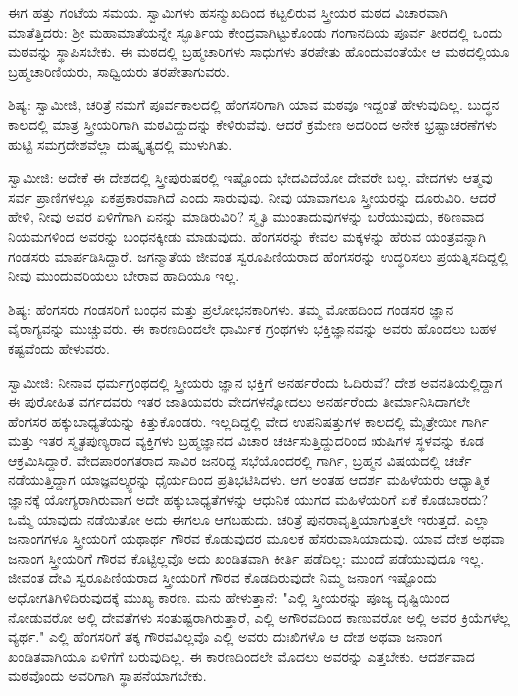 ಈಗ ಹತ್ತು ಗಂಟೆಯ ಸಮಯ. ಸ್ವಾಮಿಗಳು ಹಸನ್ಮುಖದಿಂದ ಕಟ್ಟಲಿರುವ ಸ್ತ್ರೀಯರ ಮಠದ ವಿಚಾರವಾಗಿ ಮಾತೆತ್ತಿದರು: ಶ‍್ರೀ ಮಹಾಮಾತೆಯನ್ನೇ ಸ್ಫೂರ್ತಿಯ ಕೇಂದ್ರವಾಗಿಟ್ಟುಕೊಂಡು ಗಂಗಾನದಿಯ ಪೂರ್ವ ತೀರದಲ್ಲಿ ಒಂದು ಮಠವನ್ನು ಸ್ಥಾಪಿಸಬೇಕು. ಈ ಮಠದಲ್ಲಿ ಬ್ರಹ್ಮಚಾರಿಗಳು ಸಾಧುಗಳು ತರಪೇತು ಹೊಂದುವಂತೆಯೇ ಆ ಮಠದಲ್ಲಿಯೂ ಬ್ರಹ್ಮಚಾರಿಣಿಯರು, ಸಾಧ್ವಿಯರು ತರಪೇತಾಗುವರು.

ಶಿಷ್ಯ: ಸ್ವಾಮೀಜಿ, ಚರಿತ್ರೆ ನಮಗೆ ಪೂರ್ವಕಾಲದಲ್ಲಿ ಹೆಂಗಸರಿಗಾಗಿ ಯಾವ ಮಠವೂ ಇದ್ದಂತೆ ಹೇಳುವುದಿಲ್ಲ. ಬುದ್ಧನ ಕಾಲದಲ್ಲಿ ಮಾತ್ರ ಸ್ತ್ರೀಯರಿಗಾಗಿ ಮಠವಿದ್ದುದನ್ನು ಕೇಳಿರುವೆವು. ಆದರೆ ಕ್ರಮೇಣ ಅದರಿಂದ ಅನೇಕ ಭ್ರಷ್ಟಾಚರಣೆಗಳು ಹುಟ್ಟಿ ಸಮಗ್ರದೇಶವೆಲ್ಲಾ ದುಷ್ಕೃತ್ಯದಲ್ಲಿ ಮುಳುಗಿತು.

ಸ್ವಾಮೀಜಿ: ಅದೇಕೆ ಈ ದೇಶದಲ್ಲಿ ಸ್ತ್ರೀಪುರುಷರಲ್ಲಿ ಇಷ್ಟೊಂದು ಭೇದವಿದೆಯೋ ದೇವರೇ ಬಲ್ಲ. ವೇದಗಳು ಆತ್ಮವು ಸರ್ವ ಪ್ರಾಣಿಗಳಲ್ಲೂ ಏಕಪ್ರಕಾರವಾಗಿದೆ ಎಂದು ಸಾರುವುವು. ನೀವು ಯಾವಾಗಲೂ ಸ್ತ್ರೀಯರನ್ನು ದೂರುವಿರಿ. ಆದರೆ ಹೇಳಿ, ನೀವು ಅವರ ಏಳಿಗೆಗಾಗಿ ಏನನ್ನು ಮಾಡಿರುವಿರಿ? ಸ್ಮೃತಿ ಮುಂತಾದುವುಗಳನ್ನು ಬರೆಯುವುದು, ಕಠಿಣವಾದ ನಿಯಮಗಳಿಂದ ಅವರನ್ನು ಬಂಧನಕ್ಕೀಡು ಮಾಡುವುದು. ಹೆಂಗಸರನ್ನು ಕೇವಲ ಮಕ್ಕಳನ್ನು ಹೆರುವ ಯಂತ್ರವನ್ನಾಗಿ ಗಂಡಸರು ಮಾರ್ಪಡಿಸಿದ್ದಾರೆ. ಜಗನ್ಮಾತೆಯ ಜೀವಂತ ಸ್ವರೂಪಿಣಿಯರಾದ ಹೆಂಗಸರನ್ನು ಉದ್ಧರಿಸಲು ಪ್ರಯತ್ನಿಸದಿದ್ದಲ್ಲಿ ನೀವು ಮುಂದುವರಿಯಲು ಬೇರಾವ ಹಾದಿಯೂ ಇಲ್ಲ.

ಶಿಷ್ಯ: ಹೆಂಗಸರು ಗಂಡಸರಿಗೆ ಬಂಧನ ಮತ್ತು ಪ್ರಲೋಭನಕಾರಿಗಳು. ತಮ್ಮ ಮೋಹದಿಂದ ಗಂಡಸರ ಜ್ಞಾನ ವೈರಾಗ್ಯವನ್ನು ಮುಚ್ಚುವರು. ಈ ಕಾರಣದಿಂದಲೇ ಧಾರ್ಮಿಕ ಗ್ರಂಥಗಳು ಭಕ್ತಿಜ್ಞಾನವನ್ನು ಅವರು ಹೊಂದಲು ಬಹಳ ಕಷ್ಟವೆಂದು ಹೇಳುವರು.

ಸ್ವಾಮೀಜಿ: ನೀನಾವ ಧರ್ಮಗ್ರಂಥದಲ್ಲಿ ಸ್ತ್ರೀಯರು ಜ್ಞಾನ ಭಕ್ತಿಗೆ ಅನರ್ಹರೆಂದು ಓದಿರುವೆ? ದೇಶ ಅವನತಿಯಲ್ಲಿದ್ದಾಗ ಈ ಪುರೋಹಿತ ವರ್ಗದವರು ಇತರ ಜಾತಿಯವರು ವೇದಗಳನ್ನೋದಲು ಅನರ್ಹರೆಂದು ತೀರ್ಮಾನಿಸಿದಾಗಲೇ ಹೆಂಗಸರ ಹಕ್ಕುಬಾಧ್ಯತೆಯನ್ನು ಕಿತ್ತುಕೊಂಡರು. ಇಲ್ಲದಿದ್ದಲ್ಲಿ ವೇದ ಉಪನಿಷತ್ತುಗಳ ಕಾಲದಲ್ಲಿ ಮೈತ್ರೇಯೀ ಗಾರ್ಗಿ ಮತ್ತು ಇತರ ಸ್ಮೃತಪುಣ್ಯರಾದ ವ್ಯಕ್ತಿಗಳು ಬ್ರಹ್ಮಜ್ಞಾನದ ವಿಚಾರ ಚರ್ಚಿಸುತ್ತಿದ್ದುದರಿಂದ ಋಷಿಗಳ ಸ್ಥಳವನ್ನು ಕೂಡ ಆಕ್ರಮಿಸಿದ್ದಾರೆ. ವೇದಪಾರಂಗತರಾದ ಸಾವಿರ ಜನರಿದ್ದ ಸಭೆಯೊಂದರಲ್ಲಿ ಗಾರ್ಗಿ, ಬ್ರಹ್ಮನ ವಿಷಯದಲ್ಲಿ ಚರ್ಚೆ ನಡೆಯುತ್ತಿದ್ದಾಗ ಯಾಜ್ಞವಲ್ಕ್ಯರನ್ನು ಧೈರ್ಯದಿಂದ ಪ್ರತಿಭಟಿಸಿದಳು. ಆಗ ಅಂತಹ ಆದರ್ಶ ಮಹಿಳೆಯರು ಆಧ್ಯಾತ್ಮಿಕ ಜ್ಞಾನಕ್ಕೆ ಯೋಗ್ಯರಾಗಿರುವಾಗ ಅದೇ ಹಕ್ಕುಬಾಧ್ಯತೆಗಳನ್ನು ಆಧುನಿಕ ಯುಗದ ಮಹಿಳೆಯರಿಗೆ ಏಕೆ ಕೊಡಬಾರದು? ಒಮ್ಮೆ ಯಾವುದು ನಡೆಯಿತೋ ಅದು ಈಗಲೂ ಆಗಬಹುದು. ಚರಿತ್ರೆ ಪುನರಾವೃತ್ತಿಯಾಗುತ್ತಲೇ ಇರುತ್ತದೆ. ಎಲ್ಲಾ ಜನಾಂಗಗಳೂ ಸ್ತ್ರೀಯರಿಗೆ ಯಥಾರ್ಥ ಗೌರವ ಕೊಡುವುದರ ಮೂಲಕ ಹೆಸರುವಾಸಿಯಾದುವು. ಯಾವ ದೇಶ ಅಥವಾ ಜನಾಂಗ ಸ್ತ್ರೀಯರಿಗೆ ಗೌರವ ಕೊಟ್ಟಿಲ್ಲವೊ ಅದು ಖಂಡಿತವಾಗಿ ಕೀರ್ತಿ ಪಡೆದಿಲ್ಲ: ಮುಂದೆ ಪಡೆಯುವುದೂ ಇಲ್ಲ. ಜೀವಂತ ದೇವಿ ಸ್ವರೂಪಿಣಿಯರಾದ ಸ್ತ್ರೀಯರಿಗೆ ಗೌರವ ಕೊಡದಿರುವುದೇ ನಿಮ್ಮ ಜನಾಂಗ ಇಷ್ಟೊಂದು ಅಧೋಗತಿಗಿಳಿದಿರುವುದಕ್ಕೆ ಮುಖ್ಯ ಕಾರಣ. ಮನು ಹೇಳುತ್ತಾನೆ: "ಎಲ್ಲಿ ಸ್ತ್ರೀಯರನ್ನು ಪೂಜ್ಯ ದೃಷ್ಟಿಯಿಂದ ನೋಡುವರೋ ಅಲ್ಲಿ ದೇವತೆಗಳು ಸಂತುಷ್ಟರಾಗಿರುತ್ತಾರೆ, ಎಲ್ಲಿ ಅಗೌರವದಿಂದ ಕಾಣುವರೋ ಅಲ್ಲಿ ಅವರ ಕ್ರಿಯೆಗಳೆಲ್ಲ ವ್ಯರ್ಥ." ಎಲ್ಲಿ ಹೆಂಗಸರಿಗೆ ತಕ್ಕ ಗೌರವವಿಲ್ಲವೊ ಎಲ್ಲಿ ಅವರು ದುಃಖಿಗಳೊ ಆ ದೇಶ ಅಥವಾ ಜನಾಂಗ ಖಂಡಿತವಾಗಿಯೂ ಏಳಿಗೆಗೆ ಬರುವುದಿಲ್ಲ. ಈ ಕಾರಣದಿಂದಲೇ ಮೊದಲು ಅವರನ್ನು ಎತ್ತಬೇಕು. ಆದರ್ಶವಾದ ಮಠವೊಂದು ಅವರಿಗಾಗಿ ಸ್ಥಾಪನೆಯಾಗಬೇಕು.

